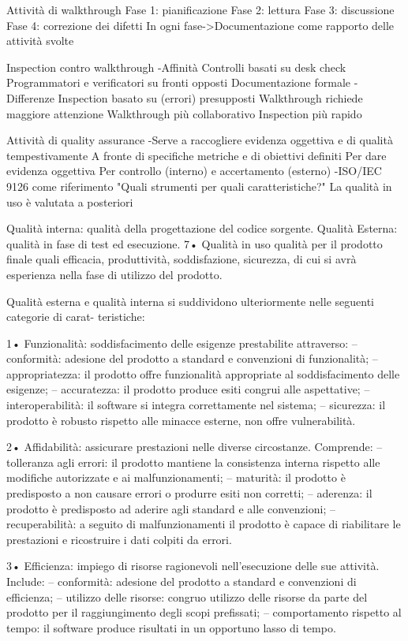 \documentclass{report}
\begin{document}
Attività di walkthrough
Fase 1: pianificazione
Fase 2: lettura
Fase 3: discussione
Fase 4: correzione dei difetti
In ogni fase->Documentazione come rapporto delle attività svolte

Inspection contro walkthrough
-Affinità
 Controlli basati su desk check
 Programmatori e verificatori su fronti opposti
 Documentazione formale
-Differenze
 Inspection basato su (errori) presupposti
 Walkthrough richiede maggiore attenzione
 Walkthrough più collaborativo
 Inspection più rapido

Attività di quality assurance
-Serve a raccogliere evidenza oggettiva e di qualità tempestivamente
 A fronte di specifiche metriche e di obiettivi definiti
 Per dare evidenza oggettiva
 Per controllo (interno) e accertamento (esterno)
-ISO/IEC 9126 come riferimento
 "Quali strumenti per quali caratteristiche?"
 La qualità in uso è valutata a posteriori

Qualità interna: qualità della progettazione del codice sorgente.
Qualità Esterna: qualità in fase di test ed esecuzione.
7• Qualità in uso qualità per il prodotto finale quali efficacia, produttività, soddisfazione, sicurezza, di cui si avrà esperienza nella fase di utilizzo del prodotto.

Qualità esterna e qualità interna si suddividono ulteriormente nelle seguenti categorie di carat-
teristiche:

1• Funzionalità: soddisfacimento delle esigenze prestabilite attraverso:
– conformità: adesione del prodotto a standard e convenzioni di funzionalità;
– appropriatezza: il prodotto offre funzionalità appropriate al soddisfacimento delle esigenze;
– accuratezza: il prodotto produce esiti congrui alle aspettative;
– interoperabilità: il software si integra correttamente nel sistema;
– sicurezza: il prodotto è robusto rispetto alle minacce esterne, non offre vulnerabilità.

2• Affidabilità: assicurare prestazioni nelle diverse circostanze. Comprende:
– tolleranza agli errori: il prodotto mantiene la consistenza interna rispetto alle modifiche autorizzate e ai malfunzionamenti;
– maturità: il prodotto è predisposto a non causare errori o produrre esiti non corretti;
– aderenza: il prodotto è predisposto ad aderire agli standard e alle convenzioni;
– recuperabilità: a seguito di malfunzionamenti il prodotto è capace di riabilitare le prestazioni e ricostruire i dati colpiti da errori.

3• Efficienza: impiego di risorse ragionevoli nell’esecuzione delle sue attività. Include:
– conformità: adesione del prodotto a standard e convenzioni di efficienza;
– utilizzo delle risorse: congruo utilizzo delle risorse da parte del prodotto per il raggiungimento degli scopi prefissati;
– comportamento rispetto al tempo: il software produce risultati in un opportuno lasso di tempo.
\end{document}
